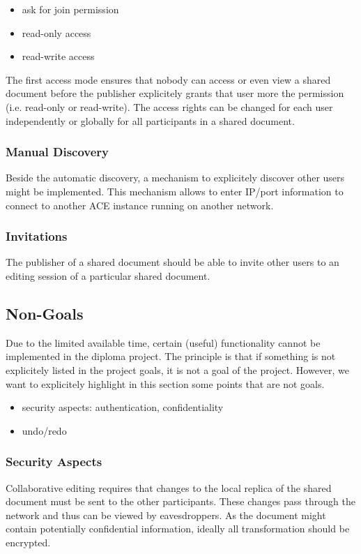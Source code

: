 \documentclass[11pt,a4paper]{article}
\begin{document}
\begin{itemize}
 \item ask for join permission
 \item read-only access
 \item read-write access
\end{itemize}

The first access mode ensures that nobody can access or even view a shared 
document before the publisher explicitely grants that user more the permission
(i.e. read-only or read-write). The access rights can be changed for each 
user independently or globally for all participants in a shared document.

\subsubsection{Manual Discovery}

Beside the automatic discovery, a mechanism to explicitely discover other users
might be implemented. This mechanism allows to enter IP/port information to
connect to another ACE instance running on another network.

\subsubsection{Invitations}
The publisher of a shared document should be able to invite other users to an 
editing session of a particular shared document.

\subsection{Non-Goals}

Due to the limited available time, certain (useful) functionality cannot be 
implemented in the diploma project. The principle is that if something is not
explicitely listed in the project goals, it is not a goal of the project. 
However, we want to explicitely highlight in this section some points that are 
not goals.

\begin{itemize}
 \item security aspects: authentication, confidentiality
 \item undo/redo
\end{itemize}

\subsubsection{Security Aspects}
Collaborative editing requires that changes to the local replica of the shared 
document must be sent to the other participants. These changes pass through
the network and thus can be viewed by eavesdroppers. As the document might 
contain potentially confidential information, ideally all transformation 
should be encrypted.
\end{document}
